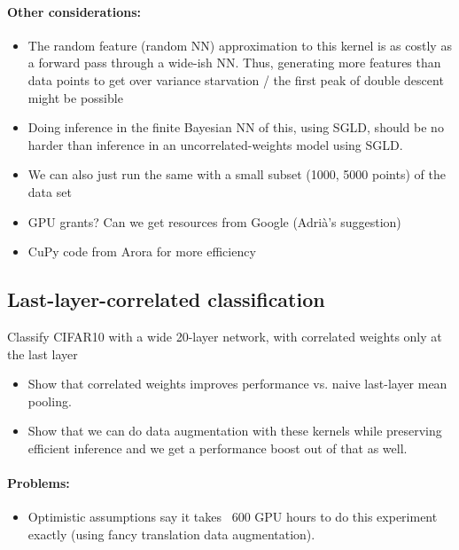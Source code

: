 \documentclass{article} %
\begin{document}
\paragraph{Other considerations:}
\begin{itemize}
  \item The random feature (random NN) approximation to this kernel is as costly
    as a forward pass through a wide-ish NN. Thus, generating more 
    features than data points to get over variance starvation / the first peak
    of double descent \citep{belkin18reconciling} might be possible
  \item Doing inference in the finite Bayesian NN of this, using SGLD, should be
    no harder than inference in an uncorrelated-weights model using SGLD.
    
    \item We can also just run the same with a small subset (1000, 5000 points) of the data set
    \item GPU grants? Can we get resources from Google (Adrià's suggestion)
    \item CuPy code from Arora for more efficiency
\end{itemize}

\subsection{Last-layer-correlated classification}
Classify CIFAR10 with a wide 20-layer network, with correlated weights only at
the last layer

\begin{itemize}
    \item Show that correlated weights improves performance vs. naive last-layer mean pooling.
    \item Show that we can do data augmentation with these kernels while preserving efficient inference and we get a performance boost out of that as well.
\end{itemize}


\paragraph{Problems:}
\begin{itemize}
\item Optimistic assumptions say it takes ~600 GPU hours to do this experiment
  exactly (using fancy translation data augmentation).
\end{itemize}
\end{document}
